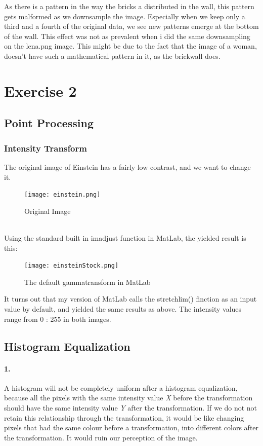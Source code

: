 \documentclass{article}
\begin{document}
As there is a pattern in the way the bricks a distributed in the wall, this pattern gets malformed as we downsample the image. Especially when we keep only a third and a fourth of the original data, we see new patterns emerge at the bottom of the wall.
This effect was not as prevalent when i did the same downsampling on the lena.png image. This might be due to the fact that the image of a woman, doesn't have such a mathematical pattern in it, as the brickwall does.

\newpage
\section{Exercise 2}
\subsection{Point Processing}
\subsubsection*{Intensity Transform}

The original image of Einstein has a fairly low contrast, and we want to change it. \\
\begin{figure}[h!]
	\centering
	\texttt{[image: einstein.png]}
	\caption{Original Image}
\end{figure}
\\
Using the standard built in imadjust function in MatLab, the yielded result is this:\\
\begin{figure}[ht!]
	\centering
	\texttt{[image: einsteinStock.png]}
	\caption{The default gammatransform in MatLab}
\end{figure}

It turns out that my version of MatLab calls the stretchlim() finction as an input value by default, and yielded the same results as above. The intensity values range from 0 : 255 in both images.

\newpage
\subsection{Histogram Equalization}
\paragraph{1.}
A histogram will not be completely uniform after a histogram equalization, because all the pixels with the same intensity value \emph{X} before the transformation should have the same intensity value \emph{Y} after the transformation. If we do not not retain this relationship through the transformation, it would be like changing pixels that had the same colour before a transformation, into different colors after the transformation. It would ruin our perception of the image. 
\end{document}
